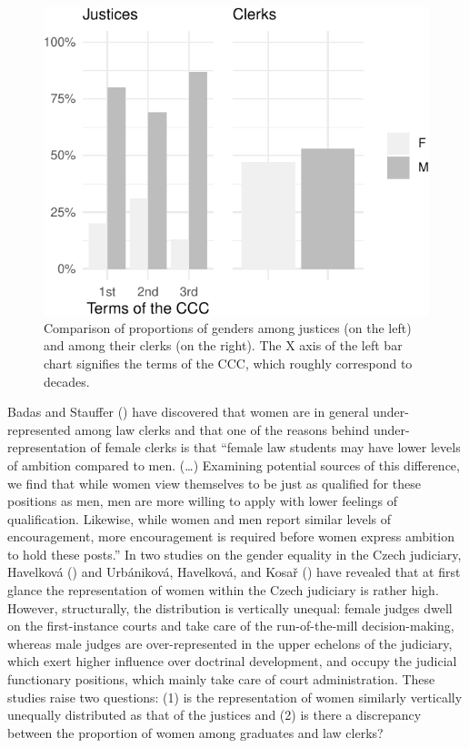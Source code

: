 \documentclass[
  11pt,
]{article}
\begin{document}
\begin{figure}
\centering
\includegraphics{The_Czech_Constitutional_Court_Database_files/figure-latex/gender-distribution-1.pdf}
\caption{\label{fig:gender-distribution}Comparison of proportions of genders among justices (on the left) and among their clerks (on the right). The X axis of the left bar chart signifies the terms of the CCC, which roughly correspond to decades.}
\end{figure}

Badas and Stauffer () have discovered that women are in general under-represented among law clerks and that one of the reasons behind under-representation of female clerks is that ``female law students may have lower levels of ambition compared to men. (\ldots) Examining potential sources of this difference, we find that while women view themselves to be just as qualified for these positions as men, men are more willing to apply with lower feelings of qualification. Likewise, while women and men report similar levels of encouragement, more encouragement is required before women express ambition to hold these posts.'' In two studies on the gender equality in the Czech judiciary, Havelková () and Urbániková, Havelková, and Kosař () have revealed that at first glance the representation of women within the Czech judiciary is rather high. However, structurally, the distribution is vertically unequal: female judges dwell on the first-instance courts and take care of the run-of-the-mill decision-making, whereas male judges are over-represented in the upper echelons of the judiciary, which exert higher influence over doctrinal development, and occupy the judicial functionary positions, which mainly take care of court administration. These studies raise two questions: (1) is the representation of women similarly vertically unequally distributed as that of the justices and (2) is there a discrepancy between the proportion of women among graduates and law clerks?
\end{document}
